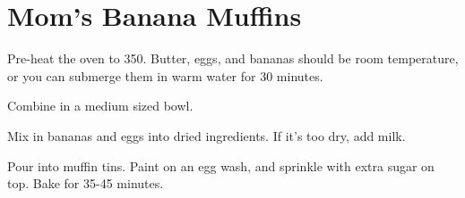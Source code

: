 \section{Mom's Banana Muffins}
\begin{recipe}


Pre-heat the oven to 350\degree{}. 
Butter, eggs, and bananas should be room temperature, or you
can submerge them in warm water for 30 minutes. 


Combine in a medium sized bowl.


Mix in bananas and eggs into dried ingredients. If it's 
too dry, add milk. 

Pour into muffin tins. Paint on an egg wash, and sprinkle with extra sugar on top. 
Bake for 35-45 minutes. 

\end{recipe}
